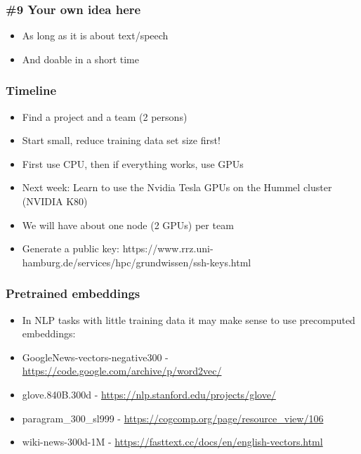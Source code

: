 \documentclass{beamer}
\begin{document}
\begin{frame}
\frametitle{\#9 Your own idea here}
 \begin{itemize}
    \item As long as it is about text/speech
    \item And doable in a short time
   \end{itemize}
\end{frame}

\begin{frame}
\frametitle{Timeline}
 \begin{itemize}
    \item Find a project and a team (2 persons)
    \item Start small, reduce training data set size first!
     \item First use CPU, then if everything works, use GPUs
    \item Next week: Learn to use the Nvidia Tesla GPUs on the Hummel cluster (NVIDIA K80)
    \item We will have about one node (2 GPUs) per team
    \item Generate a public key: https://www.rrz.uni-hamburg.de/services/hpc/grundwissen/ssh-keys.html
   \end{itemize}
\end{frame}

\begin{frame}
\frametitle{Pretrained embeddings}
 \begin{itemize}
     \item In NLP tasks with little training data it may make sense to use precomputed embeddings:
     \item GoogleNews-vectors-negative300 - \url{https://code.google.com/archive/p/word2vec/}
     \item glove.840B.300d - \url{https://nlp.stanford.edu/projects/glove/}
     \item paragram\_300\_sl999 - \url{https://cogcomp.org/page/resource_view/106}
     \item wiki-news-300d-1M - \url{https://fasttext.cc/docs/en/english-vectors.html}
   \end{itemize}
\end{frame}
\end{document}
